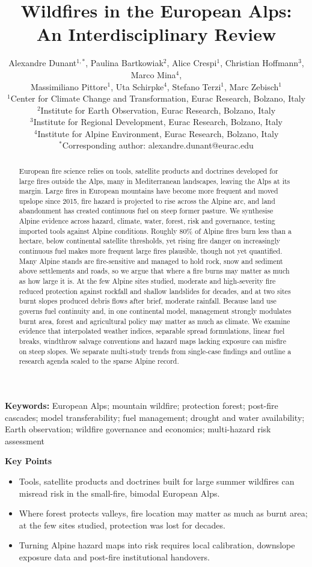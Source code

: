 \documentclass[11pt,a4paper]{article}
\title{
Wildfires in the European Alps:\\
An Interdisciplinary Review
}
\author{
Alexandre Dunant$^{1,*}$, Paulina Bartkowiak$^{2}$, Alice Crespi$^{1}$, Christian Hoffmann$^{3}$, Marco Mina$^{4}$,\\
Massimiliano Pittore$^{1}$, Uta Schirpke$^{4}$, Stefano Terzi$^{1}$, Marc Zebisch$^{1}$ \\[2mm]
\small $^{1}$Center for Climate Change and Transformation, Eurac Research, Bolzano, Italy \\
\small $^{2}$Institute for Earth Observation, Eurac Research, Bolzano, Italy \\
\small $^{3}$Institute for Regional Development, Eurac Research, Bolzano, Italy \\
\small $^{4}$Institute for Alpine Environment, Eurac Research, Bolzano, Italy \\[1mm]
\small $^{*}$Corresponding author: alexandre.dunant@eurac.edu
}
\date{}
\newif\ifaguformat
\begin{document}
\maketitle


\begin{abstract}
\noindent
European fire science relies on tools, satellite products and doctrines developed for large fires outside the Alps, many in Mediterranean landscapes, leaving the Alps at its margin. Large fires in European mountains have become more frequent and moved upslope since 2015, fire hazard is projected to rise across the Alpine arc, and land abandonment has created continuous fuel on steep former pasture. We synthesise Alpine evidence across hazard, climate, water, forest, risk and governance, testing imported tools against Alpine conditions. Roughly 80\% of Alpine fires burn less than a hectare, below continental satellite thresholds, yet rising fire danger on increasingly continuous fuel makes more frequent large fires plausible, though not yet quantified. Many Alpine stands are fire-sensitive and managed to hold rock, snow and sediment above settlements and roads, so we argue that where a fire burns may matter as much as how large it is. At the few Alpine sites studied, moderate and high-severity fire reduced protection against rockfall and shallow landslides for decades, and at two sites burnt slopes produced debris flows after brief, moderate rainfall. Because land use governs fuel continuity and, in one continental model, management strongly modulates burnt area, forest and agricultural policy may matter as much as climate. We examine evidence that interpolated weather indices, separable spread formulations, linear fuel breaks, windthrow salvage conventions and hazard maps lacking exposure can misfire on steep slopes. We separate multi-study trends from single-case findings and outline a research agenda scaled to the sparse Alpine record.
\end{abstract}

\noindent\textbf{Keywords:}
European Alps; mountain wildfire; protection forest; post-fire cascades; model transferability; fuel management; drought and water availability; Earth observation; wildfire governance and economics; multi-hazard risk assessment

\ifaguformat
\vspace{1em}
\noindent\textbf{Key Points}
\begin{itemize}
\setlength{\itemsep}{2pt}
\item Tools, satellite products and doctrines built for large summer wildfires can misread risk in the small-fire, bimodal European Alps.
\item Where forest protects valleys, fire location may matter as much as burnt area; at the few sites studied, protection was lost for decades.
\item Turning Alpine hazard maps into risk requires local calibration, downslope exposure data and post-fire institutional handovers.
\end{itemize}
\end{document}
